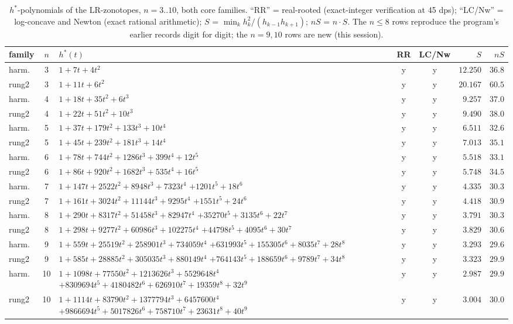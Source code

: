 \begin{table}[htbp]
\centering
\footnotesize
\caption{$h^*$-polynomials of the LR-zonotopes, $n=3..10$, both core
families. ``RR'' = real-rooted (exact-integer verification at 45 dps);
``LC/Nw'' = log-concave and Newton (exact rational arithmetic);
$S$ = $\min_k h_k^2/(h_{k-1}h_{k+1})$; $nS$ = $n\cdot S$. The $n\le8$
rows reproduce the program's earlier records digit for digit; the
$n=9,10$ rows are new (this session).}
\label{tab:hstar}
\begin{tabularx}{\textwidth}{@{} l c >{\raggedright\arraybackslash}X c c r r @{}}
\toprule
family & $n$ & $h^*(t)$ & RR & LC/Nw & $S$ & $nS$ \\
\midrule
harm. & 3 & $1+7t+4t^2$ & y & y & $12.250$ & $36.8$ \\
rung2 & 3 & $1+11t+6t^2$ & y & y & $20.167$ & $60.5$ \\
harm. & 4 & $1+18t+35t^2+6t^3$ & y & y & $9.257$ & $37.0$ \\
rung2 & 4 & $1+22t+51t^2+10t^3$ & y & y & $9.490$ & $38.0$ \\
harm. & 5 & $1+37t+179t^2+133t^3+10t^4$ & y & y & $6.511$ & $32.6$ \\
rung2 & 5 & $1+45t+239t^2+181t^3+14t^4$ & y & y & $7.013$ & $35.1$ \\
harm. & 6 & $1+78t+744t^2+1286t^3+399t^4+12t^5$ & y & y & $5.518$
& $33.1$ \\
rung2 & 6 & $1+86t+920t^2+1682t^3+535t^4+16t^5$ & y & y & $5.748$
& $34.5$ \\
harm. & 7 & $1+147t+2522t^2+8948t^3+7323t^4$\newline
$+1201t^5+18t^6$ & y & y & $4.335$ & $30.3$ \\
rung2 & 7 & $1+161t+3024t^2+11144t^3+9295t^4$\newline
$+1551t^5+24t^6$ & y & y & $4.418$ & $30.9$ \\
harm. & 8 & $1+290t+8317t^2+51458t^3+82947t^4$\newline
$+35270t^5+3135t^6+22t^7$ & y & y & $3.791$ & $30.3$ \\
rung2 & 8 & $1+298t+9277t^2+60986t^3+102275t^4$\newline
$+44798t^5+4095t^6+30t^7$ & y & y & $3.829$ & $30.6$ \\
harm. & 9 & $1+559t+25519t^2+258901t^3+734059t^4$\newline
$+631993t^5+155305t^6+8035t^7+28t^8$ & y & y & $3.293$ & $29.6$ \\
rung2 & 9 & $1+585t+28885t^2+305035t^3+880149t^4$\newline
$+764143t^5+188659t^6+9789t^7+34t^8$ & y & y & $3.323$ & $29.9$ \\
harm. & 10 & $1+1098t+77550t^2+1213626t^3+5529648t^4$\newline
$+8309694t^5+4180482t^6+626910t^7+19359t^8+32t^9$ & y & y & $2.987$
& $29.9$ \\
rung2 & 10 & $1+1114t+83790t^2+1377794t^3+6457600t^4$\newline
$+9866694t^5+5017826t^6+758710t^7+23631t^8+40t^9$ & y & y & $3.004$
& $30.0$ \\
\bottomrule
\end{tabularx}
\end{table}

